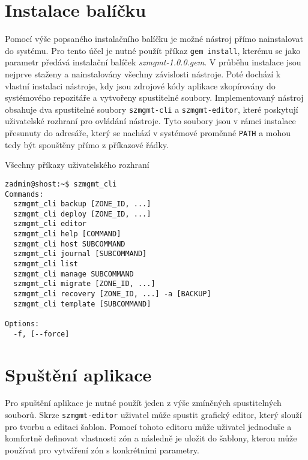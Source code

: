 \section{Instalace balíčku}
\label{appendix:installation:installation}
Pomocí výše popsaného instalačního balíčku je možné nástroj přímo nainstalovat do systému. Pro tento účel je nutné použít příkaz
\texttt{gem install}, kterému se jako parametr předává instalační balíček \textit{szmgmt-1.0.0.gem}. V průběhu instalace jsou nejprve
staženy a nainstalovány všechny závislosti nástroje. Poté dochází k vlastní instalaci nástroje, kdy jsou zdrojové kódy aplikace
zkopírovány do systémového repozitáře a vytvořeny spustitelné soubory. Implementovaný nástroj obsahuje dva spustitelné soubory
\texttt{szmgmt-cli} a \texttt{szmgmt-editor}, které poskytují uživatelské rozhraní pro ovládání nástroje. Tyto soubory jsou v
rámci instalace přesunuty do adresáře, který se nachází v systémové proměnné \texttt{PATH} a mohou tedy být spouštěny přímo 
z příkazové řádky.
\begin{listing} 
 \caption{Všechny příkazy uživatelského rozhraní}
 \begin{verbatim}
zadmin@shost:~$ szmgmt_cli 
Commands:
  szmgmt_cli backup [ZONE_ID, ...]
  szmgmt_cli deploy [ZONE_ID, ...]
  szmgmt_cli editor
  szmgmt_cli help [COMMAND]
  szmgmt_cli host SUBCOMMAND
  szmgmt_cli journal [SUBCOMMAND]
  szmgmt_cli list
  szmgmt_cli manage SUBCOMMAND
  szmgmt_cli migrate [ZONE_ID, ...]
  szmgmt_cli recovery [ZONE_ID, ...] -a [BACKUP]
  szmgmt_cli template [SUBCOMMAND]

Options:
  -f, [--force]
 \end{verbatim}
 \label{code:cli}
\end{listing}
\section{Spuštění aplikace}
\label{appendix:installation:start}
Pro spuštění aplikace je nutné použít jeden z výše zmíněných spustitelných souborů. Skrze \texttt{szmgmt-editor} uživatel může
spustit grafický editor, který slouží pro tvorbu a editaci šablon. Pomocí tohoto editoru může uživatel jednoduše a komfortně
definovat vlastnosti zón a následně je uložit do šablony, kterou může používat pro vytváření zón s konkrétními parametry.

